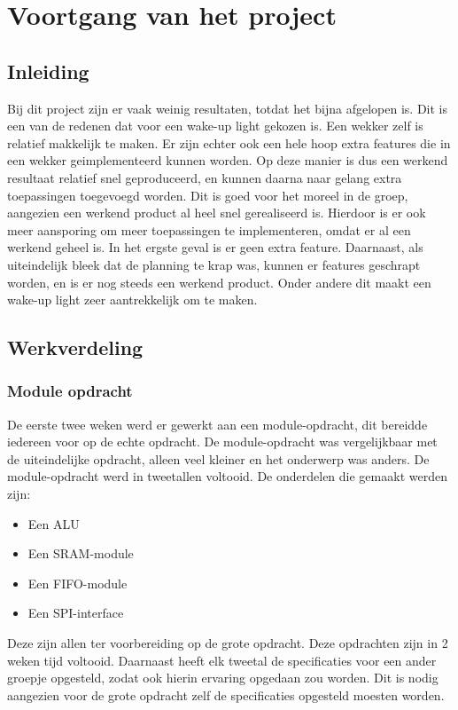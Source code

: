 \chapter{Voortgang van het project}

\section{Inleiding}
Bij dit project zijn er vaak weinig resultaten, totdat het bijna afgelopen is. 
Dit is een van de redenen dat voor een wake-up light gekozen is.
Een wekker zelf is relatief makkelijk te maken. 
Er zijn echter ook een hele hoop extra features die in een wekker geimplementeerd kunnen worden. 
Op deze manier is dus een werkend resultaat relatief snel geproduceerd, en kunnen daarna naar gelang extra toepassingen toegevoegd worden. 
Dit is goed voor het moreel in de groep, aangezien een werkend product al heel snel gerealiseerd is.
Hierdoor is er ook meer aansporing om meer toepassingen te implementeren, omdat er al een werkend geheel is. 
In het ergste geval is er geen extra feature.
Daarnaast, als uiteindelijk bleek dat de planning te krap was, kunnen er features geschrapt worden, en is er nog steeds een werkend product. 
Onder andere dit maakt een wake-up light zeer aantrekkelijk om te maken.

\section{Werkverdeling}
\subsection{Module opdracht}
De eerste twee weken werd er gewerkt aan een module-opdracht, dit bereidde iedereen voor op de echte opdracht. 
De module-opdracht was vergelijkbaar met de uiteindelijke opdracht, alleen veel kleiner en het onderwerp was anders.
De module-opdracht werd in tweetallen voltooid. De onderdelen die gemaakt werden zijn:
\begin{itemize}[nolistsep]
	\item Een ALU
	\item Een SRAM-module
	\item Een FIFO-module
	\item Een SPI-interface
\end{itemize}
Deze zijn allen ter voorbereiding op de grote opdracht. Deze opdrachten zijn in 2 weken tijd voltooid. 
Daarnaast heeft elk tweetal de specificaties voor een ander groepje opgesteld, zodat ook hierin ervaring opgedaan zou worden.
Dit is nodig aangezien voor de grote opdracht zelf de specificaties opgesteld moesten worden. 

